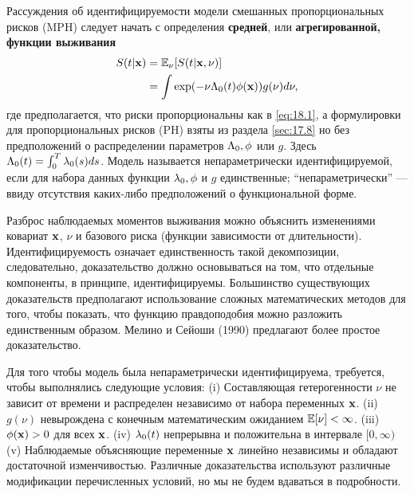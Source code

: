 Рассуждения об идентифицируемости модели смешанных пропорциональных рисков (MPH) следует начать с определения \textbf{средней}, или \textbf{агрегированной, функции выживания}
    \begin{align}
        \label{eq:18.17}
        S(t|\mathbf{x}) &= \mathbb{E}_\nu[S(t|\mathbf{x},\nu)] \\
                &= \int\exp(-\nu\Lambda_0(t)\phi(\mathbf{x})) g(\nu)d\nu, \notag
    \end{align}
где предполагается, что риски пропорциональны как в \ref{eq:18.1}, а формулировки для пропорциональных рисков (PH) взяты из раздела \ref{sec:17.8} 
но без предположений о распределении параметров $\Lambda_0, \phi$ или $g$. Здесь $\Lambda_0(t) = \int^{T}_{0}\lambda_0(s)ds$. Модель называется непараметрически идентифицируемой, если для набора данных функции $\lambda_0, \phi$ и $g$ единственные; ``непараметрически'' --- ввиду отсутствия каких-либо предположений о функциональной форме.

Разброс наблюдаемых моментов выживания можно объяснить изменениями ковариат $\mathbf{x}$, $\nu$ и базового риска (функции зависимости от длительности). Идентифицируемость означает единственность такой декомпозиции, следовательно, доказательство должно основываться на том, что отдельные компоненты, в принципе, идентифицируемы. Большинство существующих доказательств предполагают использование сложных математических методов для того, чтобы показать, что функцию правдоподобия можно разложить единственным образом. Мелино и Сейоши (1990) предлагают более простое доказательство.

Для того чтобы модель была непараметрически идентифицируема, требуется, чтобы выполнялись следующие условия:
(i) Составляющая гетерогенности $\nu$ не зависит от времени и распределен независимо от набора переменных $\mathbf{x}$.
(ii) $g(\nu)$ невырождена с конечным математическим ожиданием $\mathbb{E}[\nu] < \infty$.
(iii) $\phi(\mathbf{x}) > 0$ для всех $\mathbf{x}$.
(iv) $\lambda_0(t)$ непрерывна и положительна в интервале $[0, \infty)$
(v) Наблюдаемые объясняющие переменные $\mathbf{x}$ линейно независимы и обладают достаточной изменчивостью.
Различные доказательства используют различные модификации перечисленных условий, но мы не будем вдаваться в подробности.

